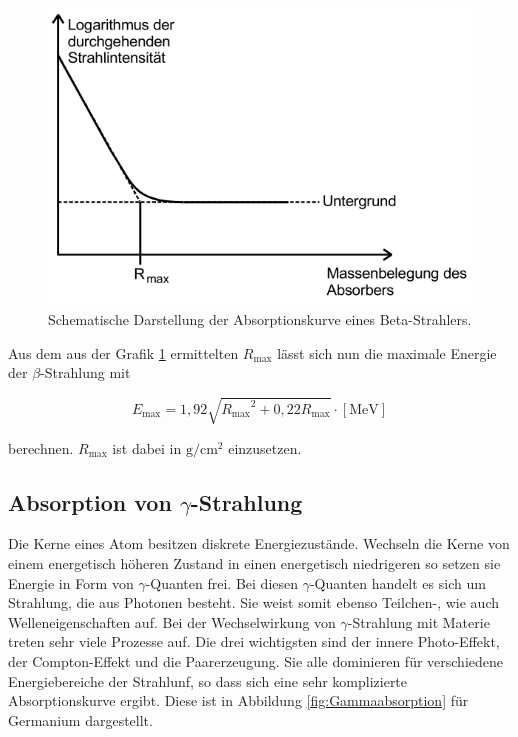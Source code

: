 \begin{figure}
  \centering
  \includegraphics[scale=0.7]{pictures/betaabsorption.png}
  \caption{Schematische Darstellung der Absorptionskurve eines Beta-Strahlers.\cite{sample}}
  \label{fig:betaabsorption}
\end{figure}

Aus dem aus der Grafik \ref{fig:betaabsorption} ermittelten $R_\text{max}$ lässt sich nun die maximale Energie der $\beta$-Strahlung mit

\begin{equation}
  E_\text{max} = 1,92 \sqrt{{R_\text{max}}^2 + 0,22 R_\text{max}} \cdot [\si{\mega\electronvolt}]
  \label{eqn:betaenergie}
\end{equation}

berechnen. $R_\text{max}$ ist dabei in $\si{\gram\per\centi\metre\squared}$ einzusetzen.

\FloatBarrier
\subsection{Absorption von \texorpdfstring{$\gamma$}{gamma}-Strahlung}

Die Kerne eines Atom besitzen diskrete Energiezustände.
Wechseln die Kerne von einem energetisch höheren Zustand in einen energetisch niedrigeren so setzen sie Energie in Form von $\gamma$-Quanten frei.
Bei diesen $\gamma$-Quanten handelt es sich um Strahlung, die aus Photonen besteht.
Sie weist somit ebenso Teilchen-, wie auch Welleneigenschaften auf.
Bei der Wechselwirkung von $\gamma$-Strahlung mit Materie treten sehr viele Prozesse auf.
Die drei wichtigsten sind der innere Photo-Effekt, der Compton-Effekt und die Paarerzeugung.
Sie alle dominieren für verschiedene Energiebereiche der Strahlunf, so dass sich eine sehr komplizierte Absorptionskurve ergibt.
Diese ist in Abbildung \ref{fig:Gammaabsorption} für Germanium dargestellt.


